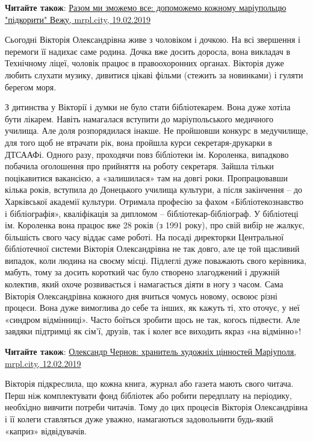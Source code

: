 \textbf{Читайте також}: \href{https://mrpl.city/blogs/view/razom-mi-zmozhemo-vse-dopomozhemo-kozhnomu-mariupoltsyu-pidkoriti-vezhu}{%
Разом ми зможемо все: допоможемо кожному маріупольцю "підкорити" Вежу, %
mrpl.city, 19.02.2019%
}

Сьогодні Вікторія Олександрівна живе з чоловіком і дочкою. На всі звершення і
перемоги її надихає саме родина. Дочка вже досить доросла, вона викладач в
Технічному ліцеї, чоловік працює в правоохоронних органах. Вікторія дуже любить
слухати музику, дивитися цікаві фільми (стежить за новинками) і гуляти берегом
моря.

З дитинства у Вікторії і думки не було стати бібліотекарем. Вона дуже хотіла
бути лікарем. Навіть намагалася вступити до маріупольського медичного училища.
Але доля розпорядилася інакше. Не пройшовши конкурс в медучилище, для того щоб
не втрачати рік, вона пройшла курси секретаря-друкарки в ДТСААФі. Одного разу,
проходячи повз бібліотеки ім. Короленка, випадково побачила оголошення про
прийняття на роботу секретаря. Зайшла тільки поцікавитися вакансією, а
«залишилася» там на довгі роки. Пропрацювавши кілька років, вступила до
Донецького училища культури, а після закінчення – до Харківської академії
культури. Отримала професію за фахом «Бібліотекознавство і бібліографія»,
кваліфікація за дипломом – бібліотекар-бібліограф. У бібліотеці ім. Короленка
вона працює вже 28 років (з 1991 року), про свій вибір не жалкує, більшість
свого часу віддає саме роботі. На посаді директорки Центральної бібліотечної
системи Вікторія Олександрівна не так довго, але це той щасливий випадок, коли
людина на своєму місці. Підлеглі дуже поважають свого керівника, мабуть, тому
за досить короткий час було створено злагоджений і дружній колектив, який охоче
розвивається і намагається діяти в ногу з часом. Сама Вікторія Олександрівна
кожного дня вчиться чомусь новому, освоює різні процеси. Вона дуже вимоглива до
себе та інших, як кажуть ті, хто оточує, у неї «синдром відмінниці». Часто
боїться зробити щось не так, когось підвести. Але завдяки підтримці як сім’ї,
друзів, так і колег все виходить якраз «на відмінно»!

\textbf{Читайте також}: \href{https://mrpl.city/blogs/view/oleksandr-chernov-hranitel-hudozhnih-tsinnostej-mariupolya}{%
Олександр Чернов: хранитель художніх цінностей Маріуполя, %
mrpl.city, 12.02.2019%
}

Вікторія підкреслила, що кожна книга, журнал або газета мають свого читача.
Перш ніж комплектувати фонд бібліотек або робити передплату на періодику,
необхідно вивчити потреби читачів. Тому до цих процесів Вікторія Олександрівна
і її колеги ставляться дуже уважно, намагаються задовольнити будь-який «каприз»
відвідувачів.

